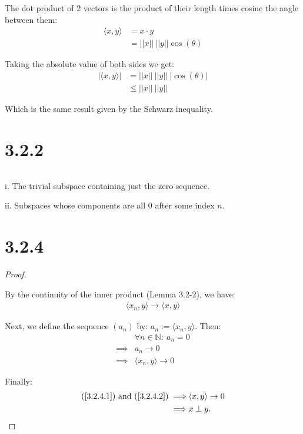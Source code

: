 \documentclass{article}
\begin{document}
The dot product of 2 vectors is the product of their length times cosine the angle between them:
\begin{align*}
  \langle x,y \rangle
  &= x \cdot y \\
  &= ||x|| \: ||y|| \cos(\theta)
\end{align*}

Taking the absolute value of both sides we get:
\begin{align*}
  |\langle x,y \rangle| 
  &= ||x|| \: ||y|| \: |\cos(\theta)| \\
  &\leq ||x|| \: ||y||
\end{align*}


Which is the same result given by the Schwarz inequality.


\section*{3.2.2}
$ $

i. The trivial subspace containing just the zero sequence.

ii. Subspaces whose components are all $0$ after some index $n$.


\section*{3.2.4}
\setcounter{equation}{0}
\begin{proof}
  $ $

  By the continuity of the inner product (Lemma 3.2-2), we have:
  \begin{align}
    \langle x_n, y \rangle \to \langle x, y \rangle \label{3.2.4.1}
  \end{align}
  
  Next, we define the sequence $(a_n)$ by:  $a_n := \langle x_n, y \rangle$. Then:
  \begin{align}
    & \forall n \in \mathbb{N}: \: a_n = 0 \nonumber \\
    \implies& a_n \to 0 \nonumber \\
    \implies& \langle x_n, y \rangle \to 0 \label{3.2.4.2}
  \end{align}

  Finally:
  \begin{align*}
    (\ref{3.2.4.1}) \text{ and } (\ref{3.2.4.2}) \implies& \langle x, y \rangle \to 0 \\
    \implies& x \perp y.
  \end{align*}

\end{proof}
\end{document}
